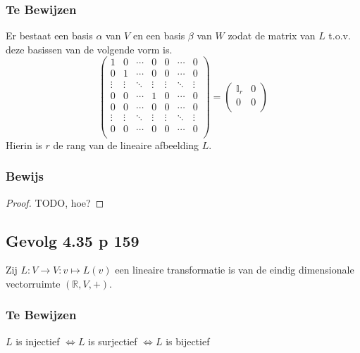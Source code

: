 \documentclass[lineaire_algebra_oplossingen.tex]{subfiles}
\begin{document}
\subsubsection*{Te Bewijzen}
Er bestaat een basis $\alpha$ van $V$ en een basis $\beta$ van $W$ zodat de matrix van $L$ t.o.v. deze basissen van de volgende vorm is.
\[
\begin{pmatrix}
1 & 0 & \cdots & 0 & 0 & \cdots & 0\\
0 & 1 & \cdots & 0 & 0 & \cdots & 0\\
\vdots & \vdots & \ddots & \vdots & \vdots & \ddots & \vdots\\
0 & 0 & \cdots & 1 & 0 & \cdots & 0\\
0 & 0 & \cdots & 0 & 0 & \cdots & 0\\
\vdots & \vdots & \ddots & \vdots & \vdots & \ddots & \vdots\\
0 & 0 & \cdots & 0 & 0 & \cdots & 0\\
\end{pmatrix}
=
\begin{pmatrix}
\mathbb{I}_r & 0\\
0 & 0\\
\end{pmatrix}
\]
Hierin is $r$ de rang van de lineaire afbeelding $L$.

\subsubsection*{Bewijs}
\begin{proof}
TODO, hoe?
\end{proof}

\subsection{Gevolg 4.35 p 159}
Zij $L: V\rightarrow V : v\mapsto L(v)$ een lineaire transformatie is van de eindig dimensionale vectorruimte $(\mathbb{R},V,+)$.
\subsubsection*{Te Bewijzen}
\begin{center}
$L$ is injectief $\Leftrightarrow L$ is surjectief $\Leftrightarrow L$ is bijectief
\end{center}
\end{document}
